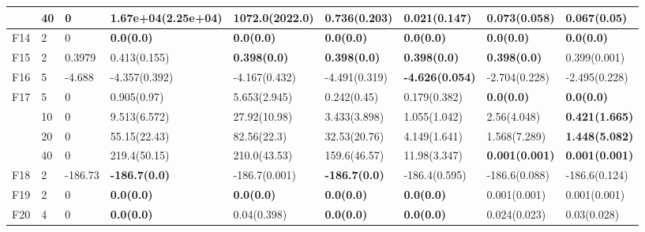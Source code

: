 \begin{longtable}{|l|l|l|l|l|l|l|l|l|}
\cmidrule{2-9} & 40  & 0        & 1.67e+04(2.25e+04)            & 1072.0(2022.0)              & 0.736(0.203)            & \textbf{0.021(0.147)}     & 0.073(0.058)           & 0.067(0.05)           \\ \hline
F14            & 2   & 0        & \textbf{0.0(0.0)}             & \textbf{0.0(0.0)}           & \textbf{0.0(0.0)}       & \textbf{0.0(0.0)}         & \textbf{0.0(0.0)}      & \textbf{0.0(0.0)}     \\ \hline
F15            & 2   & 0.3979   & 0.413(0.155)                  & \textbf{0.398(0.0)}         & \textbf{0.398(0.0)}     & \textbf{0.398(0.0)}       & \textbf{0.398(0.0)}    & 0.399(0.001)          \\ \hline
F16            & 5   & -4.688   & -4.357(0.392)                 & -4.167(0.432)               & -4.491(0.319)           & \textbf{-4.626(0.054)}    & -2.704(0.228)          & -2.495(0.228)         \\ \hline
F17            & 5   & 0        & 0.905(0.97)                   & 5.653(2.945)                & 0.242(0.45)             & 0.179(0.382)              & \textbf{0.0(0.0)}      & \textbf{0.0(0.0)}     \\
\cmidrule{2-9} & 10  & 0        & 9.513(6.572)                  & 27.92(10.98)                & 3.433(3.898)            & 1.055(1.042)              & 2.56(4.048)            & \textbf{0.421(1.665)} \\
\cmidrule{2-9} & 20  & 0        & 55.15(22.43)                  & 82.56(22.3)                 & 32.53(20.76)            & 4.149(1.641)              & 1.568(7.289)           & \textbf{1.448(5.082)} \\
\cmidrule{2-9} & 40  & 0        & 219.4(50.15)                  & 210.0(43.53)                & 159.6(46.57)            & 11.98(3.347)              & \textbf{0.001(0.001)}  & \textbf{0.001(0.001)} \\ \hline
F18            & 2   & -186.73  & \textbf{-186.7(0.0)}          & -186.7(0.001)               & \textbf{-186.7(0.0)}    & -186.4(0.595)             & -186.6(0.088)          & -186.6(0.124)         \\ \hline
F19            & 2   & 0        & \textbf{0.0(0.0)}             & \textbf{0.0(0.0)}           & \textbf{0.0(0.0)}       & \textbf{0.0(0.0)}         & 0.001(0.001)           & 0.001(0.001)          \\ \hline
F20            & 4   & 0        & \textbf{0.0(0.0)}             & 0.04(0.398)                 & \textbf{0.0(0.0)}       & \textbf{0.0(0.0)}         & 0.024(0.023)           & 0.03(0.028)           \\ \hline

\end{longtable}
